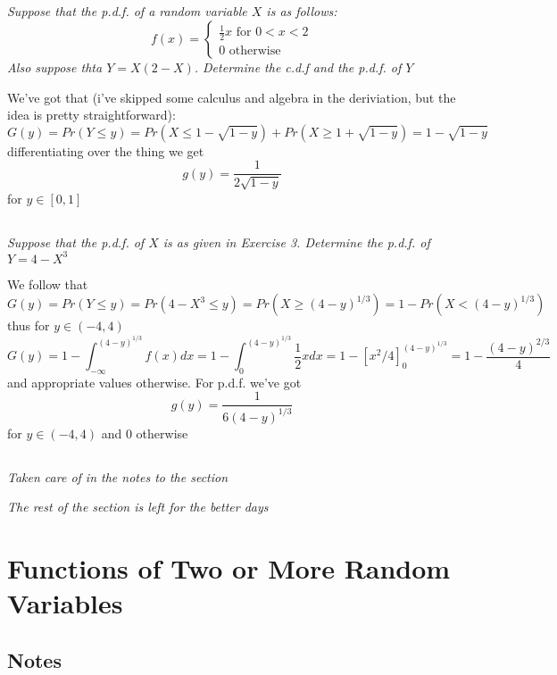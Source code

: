 \documentclass[11pt,oneside,titlepage]{book}
\begin{document}
\subsection{}

\textit{Suppose that the p.d.f. of a random variable $X$ is as follows:}
$$f(x) =
\begin{cases}
  \frac{1}{2} x \text{ for } 0 < x < 2 \\
  0 \text{ otherwise}
\end{cases}
$$
\textit{Also suppose thta $Y = X(2 - X)$. Determine the c.d.f and the p.d.f. of
  $Y$}

We've got that (i've skipped some calculus and algebra in the deriviation,
but the idea is pretty straightforward):
$$G(y) = Pr(Y \leq y) = Pr(X \leq 1 - \sqrt{1 - y}) + Pr(X \geq 1 + \sqrt{1 - y}) =
1 - \sqrt{1 - y}$$
differentiating over the thing we get
$$g(y) = \frac{1}{2\sqrt{1 - y}}$$
for $y \in [0, 1]$

\subsection{}

\textit{Suppose that the p.d.f. of $X$ is as given in Exercise 3. Determine the p.d.f.
  of $Y = 4 - X^3$}

We follow that
$$G(y) = Pr(Y \leq y) = Pr(4 - X^3 \leq y) = Pr(X \geq (4 - y)^{1/3}) = 1 - Pr(X < (4 - y)^{1/3}) $$
thus for $y \in (-4, 4)$
$$G(y) = 1 - \int_{-\infty}^{(4 - y)^{1/3}}{f(x) dx} =
1 - \int_{0}^{(4 - y)^{1/3}}{\frac{1}{2} x dx} =
1 - [x^2/4]_{0}^{(4 - y)^{1/3}} = 1 - \frac{(4 - y)^{2/3}}{4}
$$
and appropriate values otherwise. For p.d.f. we've got
$$g(y) = \frac{1}{6(4 - y)^{1/3}}$$
for $y \in (-4, 4)$ and $0$ otherwise

\subsection{}

\textit{Taken care of in the notes to the section}

\textit{The rest of the section is left for the better days}

\section{Functions  of Two or More Random Variables}

\subsection*{Notes}
\end{document}
